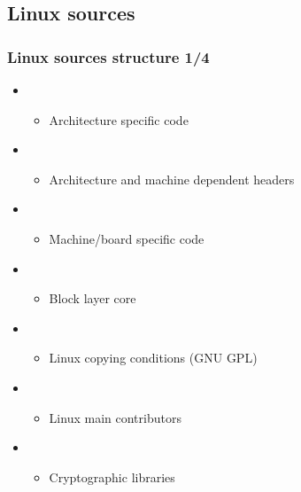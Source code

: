 \subsection{Linux sources}

\begin{frame}
  \frametitle{Linux sources structure 1/4}
  \begin{itemize}
  \item {}
    \begin{itemize}
    \item Architecture specific code
    \end{itemize}
  \item {}
    \begin{itemize}
    \item Architecture and machine dependent headers
    \end{itemize}
  \item {}
    \begin{itemize}
    \item Machine/board specific code
    \end{itemize}
  \item {}
    \begin{itemize}
    \item Block layer core
    \end{itemize}
  \item {}
    \begin{itemize}
    \item Linux copying conditions (GNU GPL)
    \end{itemize}
  \item {}
    \begin{itemize}
    \item Linux main contributors
    \end{itemize}
  \item {}
    \begin{itemize}
    \item Cryptographic libraries
    \end{itemize}
  \end{itemize}
\end{frame}


